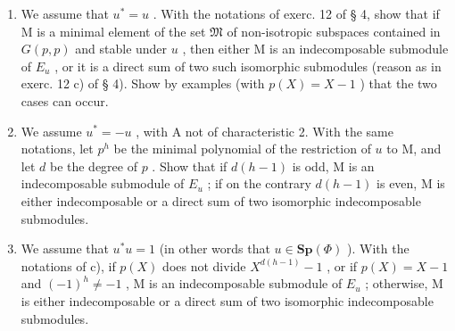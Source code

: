 \begin{enumerate}
\def\labelenumi{\alph{enumi})}
\setcounter{enumi}{1}
\item
  We assume that \(u^{*} = u\) . With the notations of exerc. 12 of § 4, show that if M is a minimal element of the set \(\mathfrak{M}\) of non-isotropic subspaces contained in \(G(p, p)\) and stable under \(u\) , then either M is an indecomposable submodule of \(E_{u}\) , or it is a direct sum of two such isomorphic submodules (reason as in exerc. 12 c) of § 4). Show by examples (with \(p(X) = X - 1\) ) that the two cases can occur.
\item
  We assume \(u^* = -u\) , with A not of characteristic 2. With the same notations, let \(p^h\) be the minimal polynomial of the restriction of \(u\) to M, and let \(d\) be the degree of \(p\) . Show that if \(d(h - 1)\) is odd, M is an indecomposable submodule of \(E_u\) ; if on the contrary \(d(h - 1)\) is even, M is either indecomposable or a direct sum of two isomorphic indecomposable submodules.
\item
  We assume that \(u^{*}u = 1\) (in other words that \(u \in \mathbf{Sp}(\Phi)\) ). With the notations of c), if \(p(X)\) does not divide \(X^{d(h-1)} - 1\) , or if \(p(X) = X - 1\) and \((-1)^{h} \neq -1\) , M is an indecomposable submodule of \(E_{u}\) ; otherwise, M is either indecomposable or a direct sum of two isomorphic indecomposable submodules.
\end{enumerate}

